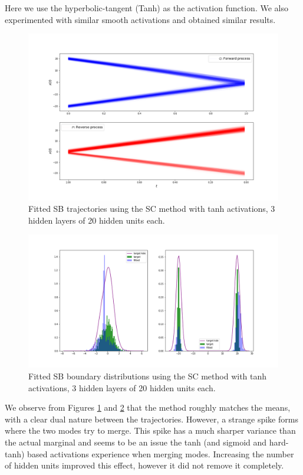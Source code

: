 \documentclass[a4paper,12pt,twoside,openright]{report}
\theoremstyle{definition}
\begin{document}
Here we use the hyperbolic-tangent (Tanh) as the activation function. We also experimented with similar smooth activations and obtained similar results.
\begin{figure}
    \centering
    \includegraphics[scale=0.4,trim={2.3cm 1cm 2.5cm 0}, clip]{images/Control/bimodal_marginals_best_tanh_trajectories.png}
    \caption{ Fitted SB  trajectories using the SC method with tanh activations, 3 hidden layers of 20 hidden units each.}
    \label{fig:trajectoriesbimodtanhnn}
\end{figure}
\begin{figure}
    \centering
    \includegraphics[scale=0.4,trim={2.3cm 1cm 2.5cm 0}, clip]{images/Control/bimodal_marginals_best_tanh.png}
    \caption{ Fitted SB  boundary distributions using the SC method with tanh activations, 3 hidden layers of 20 hidden units each.}
    \label{fig:boundsbimodtanhnn}
\end{figure}
We observe from Figures \ref{fig:trajectoriesbimodtanhnn} and \ref{fig:boundsbimodtanhnn} that the method roughly matches the means, with a clear dual nature between the trajectories. However, a strange spike forms where the two modes try to merge. This spike has a much sharper variance than the actual marginal and seems to be an issue the tanh (and sigmoid and hard-tanh) based activations experience when merging modes. Increasing the number of hidden units improved this effect, however it did not remove it completely. 
\end{document}
